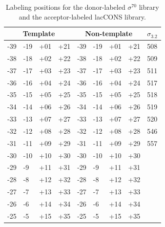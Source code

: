 \begin{table}[]
\centering
\caption{Labeling positions for the donor-labeled $\sigma^{70}$ library and the acceptor-labeled \ac{lacCONS} library.}
\label{tab:labeling_positions}
\begin{tabular}{@{}lllllllll@{}}
\toprule
\multicolumn{4}{c}{\textbf{Template}} & \multicolumn{4}{c}{\textbf{Non-template}} & \textbf{$\sigma_{3.2}$} \\ \midrule
-39     & -19     & +01     & +21     & -39      & -19      & +01      & +21      & 508                     \\
-38     & -18     & +02     & +22     & -38      & -18      & +02      & +22      & 509                     \\
-37     & -17     & +03     & +23     & -37      & -17      & +03      & +23      & 511                     \\
-36     & -16     & +04     & +24     & -36      & -16      & +04      & +24      & 517                     \\
-35     & -15     & +05     & +25     & -35      & -15      & +05      & +25      & 518                     \\
-34     & -14     & +06     & +26     & -34      & -14      & +06      & +26      & 519                     \\
-33     & -13     & +07     & +27     & -33      & -13      & +07      & +27      & 520                     \\
-32     & -12     & +08     & +28     & -32      & -12      & +08      & +28      & 546                     \\
-31     & -11     & +09     & +29     & -31      & -11      & +09      & +29      & 557                     \\
-30     & -10     & +10     & +30     & -30      & -10      & +10      & +30      &                         \\
-29     & -9      & +11     & +31     & -29      & -9       & +11      & +31      &                         \\
-28     & -8      & +12     & +32     & -28      & -8       & +12      & +32      &                         \\
-27     & -7      & +13     & +33     & -27      & -7       & +13      & +33      &                         \\
-26     & -6      & +14     & +34     & -26      & -6       & +14      & +34      &                         \\
-25     & -5      & +15     & +35     & -25      & -5       & +15      & +35      &                         \\

\end{tabular}
\end{table}
